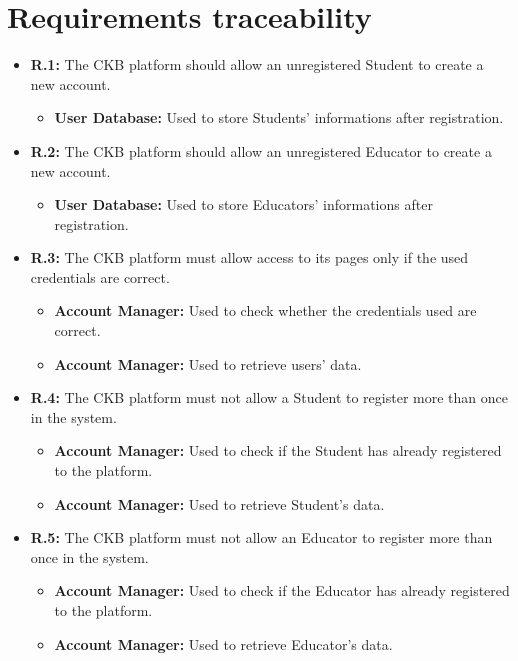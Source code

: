 \documentclass{article}
\begin{document}
{\section{Requirements traceability}
\begin{itemize}
    \item \textbf{R.1:} The CKB platform should allow an
        unregistered Student to create a new account.
        \begin{itemize}
            \item \textbf{User Database:} Used to store Students' informations after registration.
        \end{itemize}
    \item \textbf{R.2:} The CKB platform should allow an
        unregistered Educator to create a new account.
        \begin{itemize}
            \item \textbf{User Database:} Used to store Educators' informations after registration.
        \end{itemize}
    \item \textbf{R.3:} The CKB platform must allow access to its pages only if the used credentials are correct.
        \begin{itemize}
            \item \textbf{Account Manager:} Used to check whether the credentials used are correct.
            \item \textbf{Account Manager:} Used to retrieve users' data.
        \end{itemize}
    \item \textbf{R.4:} The CKB platform must not allow a Student to register more than once in the system.
          \begin{itemize}
              \item \textbf{Account Manager:} Used to check if the Student has 
              already registered to the platform.
              \item \textbf{Account Manager:} Used to retrieve Student's data.
          \end{itemize}
    \item \textbf{R.5:} The CKB platform must not allow an Educator to register more than once in the system.
          \begin{itemize}
              \item \textbf{Account Manager:} Used to check if the Educator has already
              registered to the platform.
              \item \textbf{Account Manager:} Used to retrieve Educator's data.

\end{itemize}
\end{itemize}}
\end{document}
